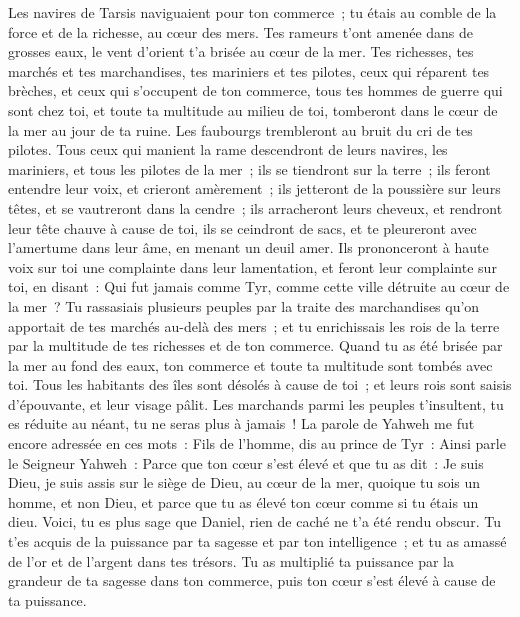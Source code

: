 \begin{multicols}{2}
Les navires de Tarsis naviguaient pour ton commerce~; tu étais au comble de la force et de la richesse, au cœur des mers.
Tes rameurs t'ont amenée dans de grosses eaux, le vent d'orient t'a brisée au cœur de la mer.
Tes richesses, tes marchés et tes marchandises, tes mariniers et tes pilotes, ceux qui réparent tes brèches, et ceux qui s'occupent de ton commerce, tous tes hommes de guerre qui sont chez toi, et toute ta multitude au milieu de toi, tomberont dans le cœur de la mer au jour de ta ruine.
Les faubourgs trembleront au bruit du cri de tes pilotes.
Tous ceux qui manient la rame descendront de leurs navires, les mariniers, et tous les pilotes de la mer~; ils se tiendront sur la terre~;
ils feront entendre leur voix, et crieront amèrement~; ils jetteront de la poussière sur leurs têtes, et se vautreront dans la cendre~;
ils arracheront leurs cheveux, et rendront leur tête chauve à cause de toi, ils se ceindront de sacs, et te pleureront avec l'amertume dans leur âme, en menant un deuil amer.
Ils prononceront à haute voix sur toi une complainte dans leur lamentation, et feront leur complainte sur toi, en disant~: Qui fut jamais comme Tyr, comme cette ville détruite au cœur de la mer~?
Tu rassasiais plusieurs peuples par la traite des marchandises qu'on apportait de tes marchés au-delà des mers~; et tu enrichissais les rois de la terre par la multitude de tes richesses et de ton commerce.
Quand tu as été brisée par la mer au fond des eaux, ton commerce et toute ta multitude sont tombés avec toi.
Tous les habitants des îles sont désolés à cause de toi~; et leurs rois sont saisis d'épouvante, et leur visage pâlit.
Les marchands parmi les peuples t'insultent, tu es réduite au néant, tu ne seras plus à jamais~!
\VerseOne{}La parole de Yahweh me fut encore adressée en ces mots~:
Fils de l'homme, dis au prince de Tyr~: Ainsi parle le Seigneur Yahweh~: Parce que ton cœur s'est élevé et que tu as dit~: Je suis Dieu, je suis assis sur le siège de Dieu, au cœur de la mer, quoique tu sois un homme, et non Dieu, et parce que tu as élevé ton cœur comme si tu étais un dieu.
Voici, tu es plus sage que Daniel, rien de caché ne t'a été rendu obscur.
Tu t'es acquis de la puissance par ta sagesse et par ton intelligence~; et tu as amassé de l'or et de l'argent dans tes trésors.
Tu as multiplié ta puissance par la grandeur de ta sagesse dans ton commerce, puis ton cœur s'est élevé à cause de ta puissance.

\end{multicols}
